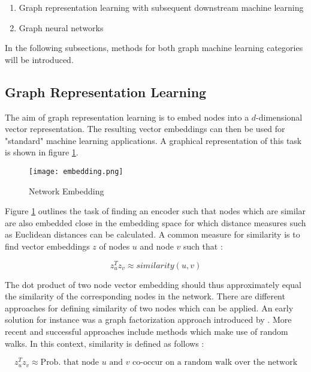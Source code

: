 	\begin{enumerate}
		\item Graph representation learning with subsequent downstream machine
			learning
		\item Graph neural networks
	\end{enumerate}
	
	\noindent In the following subsections, methods for both graph machine learning
	categories will be introduced.

	\subsection{Graph Representation Learning}

	The aim of graph representation learning is to embed nodes into a
	$d$-dimensional vector representation. The resulting vector embeddings can
	then be used for "standard" machine learning applications. A graphical
	representation of this task is shown in figure \ref{fig:embedding}.

	\begin{figure}[h]
		\centering
		\texttt{[image: embedding.png]}
		\caption{Network Embedding}
		\cite{leskovec2021lecture}
		\label{fig:embedding}
	\end{figure}

	\noindent Figure \ref{fig:embedding} outlines the task of finding an
	encoder such that nodes which are similar are also embedded close in the
	embedding space for which distance measures such as Euclidean distances can
	be calculated. A common measure for similarity is to find vector embeddings 
	$z$ of nodes $u$ and node $v$ such that \citep{leskovec2021lecture}:

	\begin{equation}
		z_u^Tz_v \approx similarity(u,v)
	\end{equation}

	\noindent The dot product of two node vector embedding should thus
	approximately equal the similarity of the corresponding nodes in the
	network. There are different approaches for defining similarity of two
	nodes which can be applied. An early solution for instance was a graph
	factorization approach introduced by \cite{ahmed2013distributed}. More
	recent and successful approaches include methods which make use of random
	walks. In this context, similarity is defined as follows
	\citep{leskovec2021lecture}:

	\begin{equation}
		z_u^Tz_v \approx \text{Prob. that node $u$ and $v$ co-occur on a random walk over the network}
	\end{equation}

